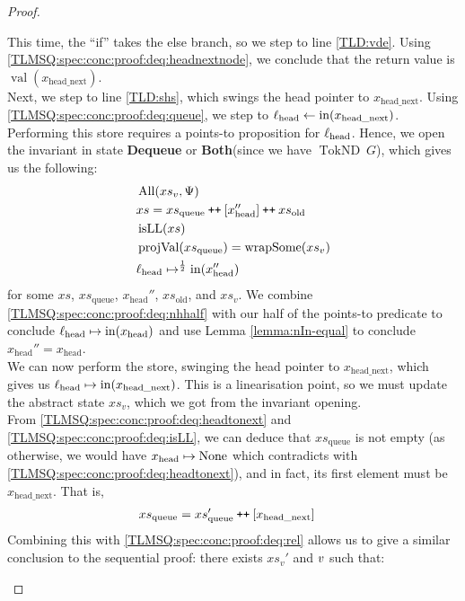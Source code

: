 \documentclass[a4paper, 10pt]{report}
\theoremstyle{definition}
\newcommand{\xsc}{xs}
\newcommand{\xsqueue}{xs_{\mathrm{queue}}}
\newcommand{\xsold}{xs_{\mathrm{old}}}
\newcommand{\isLL}{\operatorname{isLL}}
\newcommand{\AllP}{\operatorname{All}}
\newcommand{\projval}{\operatorname{projVal}}
\newcommand{\wrapsome}{\operatorname{wrapSome}}
\newcommand{\locN}[1]{\loc_{\mathrm{#1}}}
\newcommand{\lochead}{\locN{head}}
\newcommand{\nIn}[1]{\operatorname{in}(#1)}
\newcommand{\nVal}[1]{\operatorname{val}(#1)}
\newcommand{\node}{x}
\newcommand{\nodeN}[1]{\node_{\mathrm{#1}}}
\newcommand{\nodehead}{\nodeN{head}}
\newcommand{\nodeheadnext}{\nodeN{head\_next}}
\newcommand{\absvalue}{\val}
\newcommand{\absvalueList}{xs_v}
\newcommand{\DequeueState}{\textbf{Dequeue}\xspace}
\newcommand{\BothState}{\textbf{Both}\xspace}
\newcommand{\Qg}{G}
\newcommand{\TokND}[1]{\operatorname{TokND} ~ #1}
\newcommand{\TokNDQg}{\TokND{\Qg}}
\newcommand\catenate{\mathbin{\text{\ttfamily\upshape ++}}}
\begin{document}
\begin{proof}
\begin{itemize}
  This time, the ``if'' takes the else branch, so we step to line \ref{TLD:vde}. Using \ref{TLMSQ:spec:conc:proof:deq:headnextnode}, we conclude that the return value is $\nVal{\nodeheadnext}$.\\
  Next, we step to line \ref{TLD:shs}, which swings the head pointer to $\nodeheadnext$. Using \ref{TLMSQ:spec:conc:proof:deq:queue}, we step to $\lochead \gets \nIn{\nodeheadnext}$. Performing this store requires a points-to proposition for $\lochead$. Hence, we open the invariant in state \DequeueState or \BothState (since we have $\TokNDQg$), which gives us the following:
  \begin{align}
    &\AllP(\absvalueList, \Psi)\label{TLMSQ:spec:conc:proof:deq:allP}\\
    &\xsc = \xsqueue \catenate [\nodehead''] \catenate \xsold\label{TLMSQ:spec:conc:proof:deq:xsrel}\\
    &\isLL(\xsc)\label{TLMSQ:spec:conc:proof:deq:isLL}\\
    &\projval(\xsqueue) = \wrapsome(\absvalueList)\label{TLMSQ:spec:conc:proof:deq:rel}\\
    &\lochead \mapsto^{\frac{1}{2}} \nIn{\nodehead''}\label{TLMSQ:spec:conc:proof:deq:nhhalf}
  \end{align}
  for some $\xsc$, $\xsqueue$, $\nodehead''$,  $\xsold$, and $\absvalueList$. We combine \ref{TLMSQ:spec:conc:proof:deq:nhhalf} with our half of the points-to predicate to conclude $\lochead \mapsto \nIn{\nodehead}$ and use Lemma \ref{lemma:nIn-equal} to conclude $\nodehead'' = \nodehead$.\\
  We can now perform the store, swinging the head pointer to $\nodeheadnext$, which gives us $\lochead \mapsto \nIn{\nodeheadnext}$. This is a linearisation point, so we must update the abstract state $\absvalueList$, which we got from the invariant opening.\\
  From \ref{TLMSQ:spec:conc:proof:deq:headtonext} and \ref{TLMSQ:spec:conc:proof:deq:isLL}, we can deduce that $\xsqueue$ is not empty (as otherwise, we would have $\nodehead \mapsto \None$ which contradicts with \ref{TLMSQ:spec:conc:proof:deq:headtonext}), and in fact, its first element must be $\nodeheadnext$. That is,
  \begin{align}
    &\xsqueue = \xsqueue' \catenate [\nodeheadnext]\label{TLMSQ:spec:conc:proof:deq:xsqueue}
  \end{align}
  Combining this with \ref{TLMSQ:spec:conc:proof:deq:rel} allows us to give a similar conclusion to the sequential proof: there exists $\absvalueList'$ and $\absvalue$ such that:

\end{itemize}
\end{proof}
\end{document}
